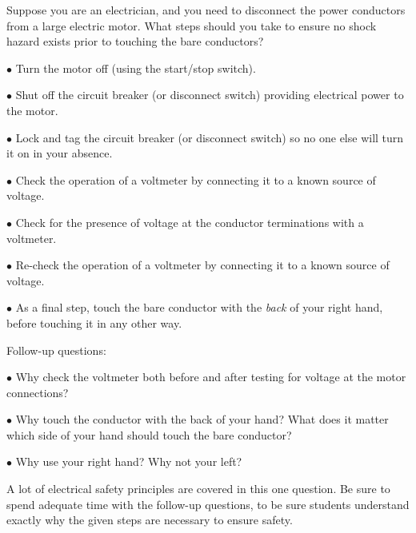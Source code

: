 

Suppose you are an electrician, and you need to disconnect the power conductors from a large electric motor.  What steps should you take to ensure no shock hazard exists prior to touching the bare conductors?







\medskip
\item{$\bullet$} Turn the motor off (using the start/stop switch).
\item{$\bullet$} Shut off the circuit breaker (or disconnect switch) providing electrical power to the motor.
\item{$\bullet$} Lock and tag the circuit breaker (or disconnect switch) so no one else will turn it on in your absence.
\item{$\bullet$} Check the operation of a voltmeter by connecting it to a known source of voltage.
\item{$\bullet$} Check for the presence of voltage at the conductor terminations with a voltmeter.
\item{$\bullet$} Re-check the operation of a voltmeter by connecting it to a known source of voltage.
\item{$\bullet$} As a final step, touch the bare conductor with the {\it back} of your right hand, before touching it in any other way.
\medskip

Follow-up questions:

\medskip
\item{$\bullet$} Why check the voltmeter both before and after testing for voltage at the motor connections?
\item{$\bullet$} Why touch the conductor with the back of your hand?  What does it matter which side of your hand should touch the bare conductor?
\item{$\bullet$} Why use your right hand?  Why not your left?
\medskip







A lot of electrical safety principles are covered in this one question.  Be sure to spend adequate time with the follow-up questions, to be sure students understand exactly why the given steps are necessary to ensure safety.




